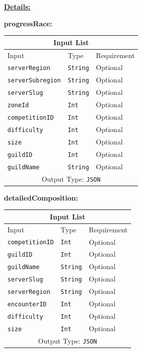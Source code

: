 \documentclass[10pt, a4paper]{memoir}
\numberwithin{equation}{section}
\theoremstyle{plain}
\theoremstyle{defp}
\theoremstyle{dotless}
\theoremstyle{definition}
\theoremstyle{dotless}
\theoremstyle{dotless}
\theoremstyle{defp}
\theoremstyle{defp}
\theoremstyle{be}          %
\theoremstyle{defp}
\newcommand\ttt[1]{\texttt{#1}}
\begin{document}
\underline{\textbf{Details:}}

\textbf{progressRace:}

\begin{table}[h!]
	\centering
	\begin{tabular}{ |p{4.2cm}|p{6cm}|p{3cm}|  }
		\hline
		\multicolumn{3}{|c|}{Input List} \\
		\hline
		Input & Type & Requirement\\
		\hline
		\ttt{serverRegion} & \ttt{String} & Optional\\
		\ttt{serverSubregion} & \ttt{String} & Optional\\
		\ttt{serverSlug} & \ttt{String} & Optional\\
		\ttt{zoneId} & \ttt{Int} & Optional\\
		\ttt{competitionID} & \ttt{Int} & Optional\\
		\ttt{difficulty} & \ttt{Int} & Optional\\
		\ttt{size} & \ttt{Int} & Optional\\
		\ttt{guildID} & \ttt{Int} & Optional\\
		\ttt{guildName} & \ttt{String} & Optional\\
		\hline
		\multicolumn{3}{|c|}{Output Type: \ttt{JSON}} \\
		\hline
	\end{tabular}
\end{table}

\medskip

\textbf{detailedComposition:}

\begin{table}[h!]
	\centering
	\begin{tabular}{ |p{4.2cm}|p{6cm}|p{3cm}|  }
		\hline
		\multicolumn{3}{|c|}{Input List} \\
		\hline
		Input & Type & Requirement\\
		\hline
		\ttt{competitionID} & \ttt{Int} & Optional\\
		\ttt{guildID} & \ttt{Int} & Optional\\
		\ttt{guildName} & \ttt{String} & Optional\\
		\ttt{serverSlug} & \ttt{String} & Optional\\
		\ttt{serverRegion} & \ttt{String} & Optional\\
		\ttt{encounterID} & \ttt{Int} & Optional\\
		\ttt{difficulty} & \ttt{Int} & Optional\\
		\ttt{size} & \ttt{Int} & Optional\\
		\hline
		\multicolumn{3}{|c|}{Output Type: \ttt{JSON}} \\
		\hline
	\end{tabular}
\end{table}
\end{document}
